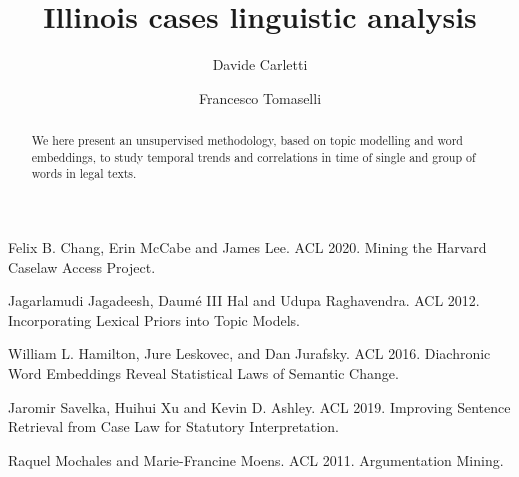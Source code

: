 \documentclass[runningheads]{llncs}
\begin{document}
\title{Illinois cases linguistic analysis}

\author{Davide Carletti \and Francesco Tomaselli}
\maketitle

\begin{abstract}
    We here present an unsupervised methodology, based on topic modelling 
    and word embeddings, to study temporal trends and correlations
    in time of single and group of words in legal texts.    
\end{abstract}






\begin{thebibliography}{8}
Felix B. Chang, Erin McCabe and James Lee. ACL 2020. Mining the Harvard Caselaw Access Project.

Jagarlamudi Jagadeesh, Daum{\'e} III Hal and Udupa Raghavendra. ACL 2012. Incorporating Lexical Priors into Topic Models.

William L. Hamilton, Jure Leskovec, and Dan Jurafsky. ACL 2016. Diachronic Word Embeddings Reveal Statistical Laws of Semantic Change. 

Jaromir Savelka, Huihui Xu and Kevin D. Ashley. ACL 2019. Improving Sentence Retrieval from Case Law for Statutory Interpretation.

Raquel Mochales and Marie-Francine Moens. ACL 2011. Argumentation Mining.

\end{thebibliography}
\end{document}
